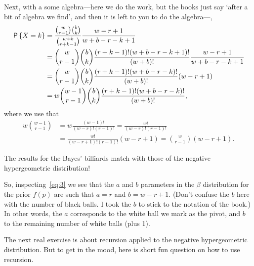 \begin{exercise}
\begin{solution}
Next, with a some algebra---here we do the work, but the books just say `after a bit of algebra we find', and then it is left to you to do the algebra---,
\begin{align}
\label{eq:17}
\P{X=k}
&= \frac{{w \choose r-1}{b \choose k}}{{w+b \choose r+k -1}}\frac{w-r+1}{w+b-r-k+1} \\
&= {w \choose r-1}{b \choose k} \frac{(r+k-1)!(w+b-r-k+1)!}{(w+b)!}\frac{w-r+1}{w+b-r-k+1} \\
&= {w \choose r-1}{b \choose k} \frac{(r+k-1)!(w+b-r-k)!}{(w+b)!}(w-r+1) \\
&= w {w -1 \choose r-1}{b \choose k} \frac{(r+k-1)!(w+b-r-k)!}{(w+b)!},
\end{align}
where we use that
\begin{align}
  w{w-1 \choose r-1} &= w\frac{ (w-1)!}{(w-r)! (r-1)!} = \frac{ w!}{(w-r)! (r-1)!} \\
&=\frac{ w!}{(w-r+1)! (r-1)!} (w-r+1)= {w\choose r-1} (w-r+1).
\end{align}

The results for the Bayes' billiards match with those of the negative hypergeometric distribution!

So, inspecting~\cref{eq:3} we see that the $a$ and $b$ parameters in the $\beta$ distribution for the prior $f(p)$ are such that $a=r$ and $b=w-r+1$.
(Don't confuse the $b$ here with the number of black balls.
I took the $b$ to stick to the notation of the book.)
In other words, the $a$ corresponds to the white ball we mark as the pivot, and $b$ to the remaining number of white balls (plus 1).
\end{solution}
\end{exercise}

The next real exercise is about recursion applied to the negative hypergeometric distribution. But to get in the mood, here is short fun question on how to use recursion.

